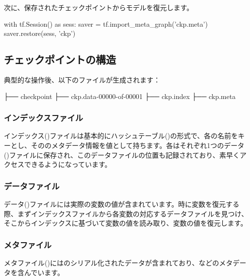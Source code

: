 \begin{content}
次に、保存されたチェックポイントからモデルを復元します。

\begin{leftbar}
\begin{python}
with tf.Session() as sess:
  saver = tf.import_meta_graph('ckp.meta')
  saver.restore(sess, 'ckp')
\end{python}
\end{leftbar}

\subsection{チェックポイントの構造}

典型的な操作後、以下のファイルが生成されます：

\begin{leftbar}
\begin{python}
├── checkpoint
├── ckp.data-00000-of-00001
├── ckp.index
├── ckp.meta
\end{python}
\end{leftbar}

\subsubsection{インデックスファイル}

インデックス()ファイルは基本的にハッシュテーブル()の形式で、各の名前をキーとし、そののメタデータ情報を値として持ちます。各はそれぞれ1つのデータ()ファイルに保存され、このデータファイルの位置も記録されており、素早くアクセスできるようになっています。

\subsubsection{データファイル}

データ()ファイルには実際の変数の値が含まれています。時に変数を復元する際、まずインデックスファイルから各変数の対応するデータファイルを見つけ、そこからインデックスに基づいて変数の値を読み取り、変数の値を復元します。

\subsubsection{メタファイル}

メタファイル()にはのシリアル化されたデータが含まれており、などのメタデータを含んでいます。


\end{content}
